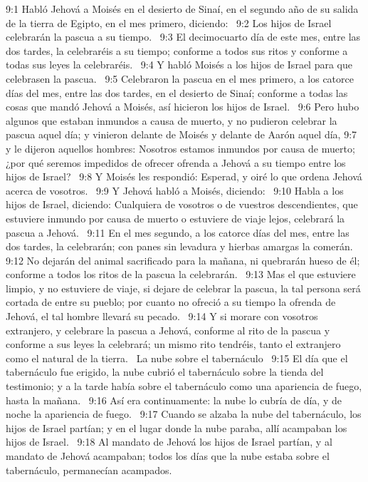 9:1 Habló Jehová a Moisés en el desierto de Sinaí, en el segundo año de su salida de la tierra de Egipto, en el mes primero, diciendo:  
9:2 Los hijos de Israel celebrarán la pascua a su tiempo.  
9:3 El decimocuarto día de este mes, entre las dos tardes, la celebraréis a su tiempo; conforme a todos sus ritos y conforme a todas sus leyes la celebraréis.  
9:4 Y habló Moisés a los hijos de Israel para que celebrasen la pascua.  
9:5 Celebraron la pascua en el mes primero, a los catorce días del mes, entre las dos tardes, en el desierto de Sinaí; conforme a todas las cosas que mandó Jehová a Moisés, así hicieron los hijos de Israel.  
9:6 Pero hubo algunos que estaban inmundos a causa de muerto, y no pudieron celebrar la pascua aquel día; y vinieron delante de Moisés y delante de Aarón aquel día, 
9:7 y le dijeron aquellos hombres: Nosotros estamos inmundos por causa de muerto; ¿por qué seremos impedidos de ofrecer ofrenda a Jehová a su tiempo entre los hijos de Israel?  
9:8 Y Moisés les respondió: Esperad, y oiré lo que ordena Jehová acerca de vosotros.  
9:9 Y Jehová habló a Moisés, diciendo:  
9:10 Habla a los hijos de Israel, diciendo: Cualquiera de vosotros o de vuestros descendientes, que estuviere inmundo por causa de muerto o estuviere de viaje lejos, celebrará la pascua a Jehová.  
9:11 En el mes segundo, a los catorce días del mes, entre las dos tardes, la celebrarán; con panes sin levadura y hierbas amargas la comerán.  
9:12 No dejarán del animal sacrificado para la mañana, ni quebrarán hueso de él; conforme a todos los ritos de la pascua la celebrarán.  
9:13 Mas el que estuviere limpio, y no estuviere de viaje, si dejare de celebrar la pascua, la tal persona será cortada de entre su pueblo; por cuanto no ofreció a su tiempo la ofrenda de Jehová, el tal hombre llevará su pecado.  
9:14 Y si morare con vosotros extranjero, y celebrare la pascua a Jehová, conforme al rito de la pascua y conforme a sus leyes la celebrará; un mismo rito tendréis, tanto el extranjero como el natural de la tierra.  
La nube sobre el tabernáculo   
9:15 El día que el tabernáculo fue erigido, la nube cubrió el tabernáculo sobre la tienda del testimonio; y a la tarde había sobre el tabernáculo como una apariencia de fuego, hasta la mañana.  
9:16 Así era continuamente: la nube lo cubría de día, y de noche la apariencia de fuego.  
9:17 Cuando se alzaba la nube del tabernáculo, los hijos de Israel partían; y en el lugar donde la nube paraba, allí acampaban los hijos de Israel.  
9:18 Al mandato de Jehová los hijos de Israel partían, y al mandato de Jehová acampaban; todos los días que la nube estaba sobre el tabernáculo, permanecían acampados.  
